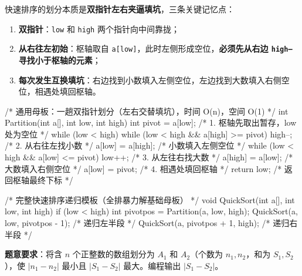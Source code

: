 \documentclass[10pt,a4paper]{ctexart}
\begin{document}

快速排序的划分本质是\textbf{双指针左右夹逼填坑}，三条关键记忆点：

\begin{enumerate}

\item \textbf{双指针}：\texttt{low} 和 \texttt{high} 两个指针向中间靠拢；

\item \textbf{从右往左初始}：枢轴取自 \texttt{a[low]}，此时左侧形成空位，\textbf{必须先从右边 \texttt{high--} 寻找小于枢轴的元素}；

\item \textbf{每次发生互换填坑}：右边找到小数填入左侧空位，左边找到大数填入右侧空位，相遇处填回枢轴。

\end{enumerate}

\begin{codebox}
/* 通用母板：一趟双指针划分（左右交替填坑），时间 O(n)，空间 O(1) */
int Partition(int a[], int low, int high) {
    int pivot = a[low];                 /* 1. 枢轴先取出暂存，low 处为空位 */
    while (low < high) {
        while (low < high && a[high] >= pivot) high--;  /* 2. 从右往左找小数 */
        a[low] = a[high];                               /* 小数填入左侧空位 */
        while (low < high && a[low] <= pivot) low++;    /* 3. 从左往右找大数 */
        a[high] = a[low];                               /* 大数填入右侧空位 */
    }
    a[low] = pivot;                     /* 4. 相遇处填回枢轴 */
    return low;                         /* 返回枢轴最终下标 */
}

/* 完整快速排序递归模板（全排暴力解基础母板） */
void QuickSort(int a[], int low, int high) {
    if (low < high) {
        int pivotpos = Partition(a, low, high);
        QuickSort(a, low, pivotpos - 1);        /* 递归左半段 */
        QuickSort(a, pivotpos + 1, high);       /* 递归右半段 */
    }
}
\end{codebox}

\par\addvspace{3pt}\par\addvspace{3pt}


\textbf{题意要求}：将含 $n$ 个正整数的数组划分为 $A_1$ 和 $A_2$（个数为 $n_1, n_2$，和为 $S_1, S_2$），使 $|n_1 - n_2|$ 最小且 $|S_1 - S_2|$ 最大。编程输出 $|S_1 - S_2|$。
\end{document}
